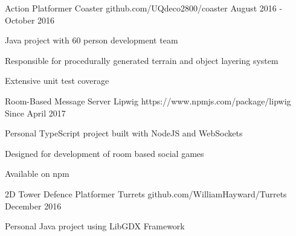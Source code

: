 


\begin{cventries}


\cventry
{Action Platformer} %
{Coaster} %
{github.com/UQdeco2800/coaster} %
{August 2016 - October 2016} %
{ %
\begin{cvitems}
\item Java project with 60 person development team
\item Responsible for procedurally generated terrain and object layering system
\item Extensive unit test coverage
\end{cvitems}
}


\cventry
{Room-Based Message Server} %
{Lipwig} %
{https://www.npmjs.com/package/lipwig} %
{Since April 2017} %
{ %
\begin{cvitems}
\item Personal TypeScript project built with NodeJS and WebSockets
\item Designed for development of room based social games
\item Available on npm
\end{cvitems}
}


\cventry
{2D Tower Defence Platformer} %
{Turrets} %
{github.com/WilliamHayward/Turrets} %
{December 2016} %
{ %
\begin{cvitems}
\item Personal Java project using LibGDX Framework
\end{cvitems}
}


\end{cventries}